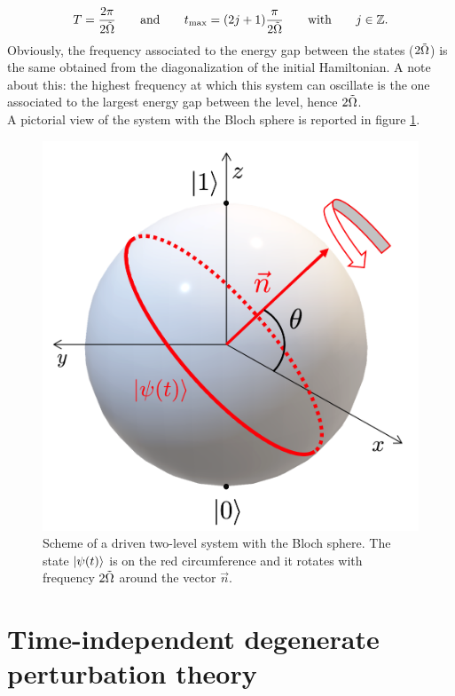 \begin{tcolorbox}
\begin{align*}
    T = \frac{2 \pi}{2 \Tilde{\Omega}} \qquad \text{and} \qquad t_\text{max} = (2j+1) \frac{\pi}{2 \Tilde{\Omega}} \qquad \text{with} \qquad j \in \mathbb{Z}. 
\end{align*}
Obviously, the frequency associated to the energy gap between the states ($2\Tilde{\Omega}$) is the same obtained from the diagonalization of the initial Hamiltonian. A note about this: the highest frequency at which this system can oscillate is the one associated to the largest energy gap between the level, hence $2\Tilde{\Omega}$. \\

A pictorial view of the system with the Bloch sphere is reported in figure \ref{fig:Bloch_sphere}.
\end{tcolorbox}

\begin{figure}[H]
\centering
\includegraphics[width=0.42\linewidth]{images/Driven_two-level_system.png}
    \caption{Scheme of a driven two-level system with the Bloch sphere. The state $\ket{\psi(t)}$ is on the red circumference and it rotates with frequency $2 \Tilde{\Omega}$ around the vector $\Vec{n}$.}
    \label{fig:Bloch_sphere}
\end{figure}

\section{Time-independent degenerate perturbation theory}
\label{sec:timedep}

